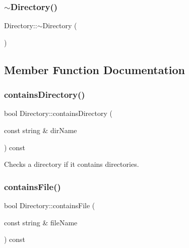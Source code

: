 \mbox{\label{class_directory_affbde8714685c61601421097d621341d}} 
\subsubsection{\texorpdfstring{$\sim$\+Directory()}{~Directory()}}
{\footnotesize\ttfamily Directory\+::$\sim$\+Directory (\begin{DoxyParamCaption}{ }\end{DoxyParamCaption})\hspace{0.3cm}{\ttfamily [inline]}}



\subsection{Member Function Documentation}
\mbox{\label{class_directory_ae84d7cdbbea5138b808dca098c28c820}} 
\subsubsection{\texorpdfstring{contains\+Directory()}{containsDirectory()}}
{\footnotesize\ttfamily bool Directory\+::contains\+Directory (\begin{DoxyParamCaption}\item[{const string \&}]{dir\+Name }\end{DoxyParamCaption}) const}



Checks a directory if it contains directories. 

\mbox{\label{class_directory_a0286ef72f0d7cd5a0be7c15c0db46942}} 
\subsubsection{\texorpdfstring{contains\+File()}{containsFile()}}
{\footnotesize\ttfamily bool Directory\+::contains\+File (\begin{DoxyParamCaption}\item[{const string \&}]{file\+Name }\end{DoxyParamCaption}) const}



